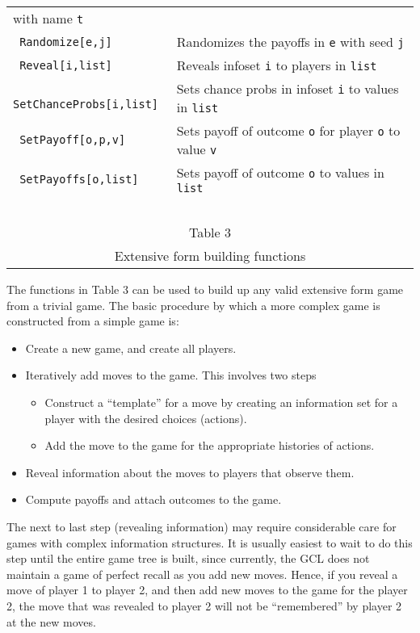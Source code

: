 \begin{table}[htp]
\begin{center}
\begin{tabular} {|l||l|}
with name \verb+t+\\
\verb+ Randomize[e,j]+ &Randomizes the payoffs in \verb+e+ with seed \verb+j+\\
\verb+ Reveal[i,list]+ &Reveals infoset \verb+i+ to players in \verb+list+\\
\verb+ SetChanceProbs[i,list]+ &Sets chance probs in infoset \verb+i+ to values in \verb+list+\\
\verb+ SetPayoff[o,p,v]+ &Sets payoff of outcome \verb+o+ for player \verb+o+ to value \verb+v+\\
\verb+ SetPayoffs[o,list]+ &Sets payoff of outcome \verb+o+ to values in \verb+list+\\
\hline
\multicolumn{2}{c}{\ }\\
\multicolumn{2}{c}{Table 3}\\
\multicolumn{2}{c}{Extensive form building functions}\\
\end{tabular}
\end{center}
\end{table}
\medskip

The functions in Table 3 can be used to build up any valid extensive
form game from a trivial game.  The basic procedure by which a more
complex game is constructed from a simple game is:

\begin{itemize}
\item
Create a new game, and create all players.  
\item
Iteratively add moves to the game.  This involves two steps
\begin{itemize}
\item
Construct a ``template'' for a move by creating an information set for
a player with the desired choices (actions).  

\item
Add the move to the game for the appropriate histories of actions.  
\end{itemize}
\item
Reveal information about the moves to players that observe them.  

\item
Compute payoffs and attach outcomes to the game.  
\end{itemize}

The next to last step (revealing information) may require considerable
care for games with complex information structures.  It is usually
easiest to wait to do this step until the entire game tree is built,
since currently, the GCL does not maintain a game of perfect recall as
you add new moves.  Hence, if you reveal a move of player 1 to player
2, and then add new moves to the game for the player 2, the move that
was revealed to player 2 will not be ``remembered'' by player 2 at the
new moves.

